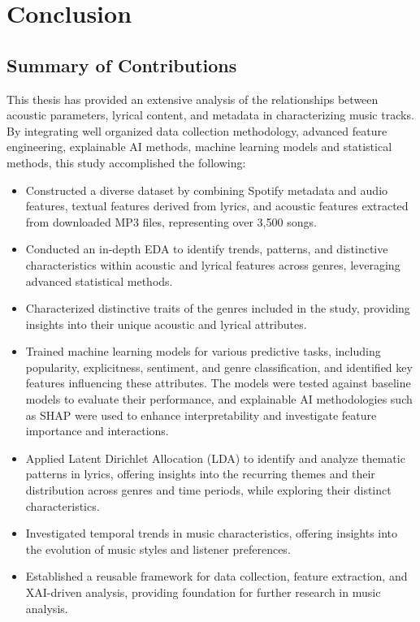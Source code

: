 \chapter{Conclusion}
\label{cha:conclusion}

\section{Summary of Contributions}
\label{sec:summaryofcontributions}

This thesis has provided an extensive analysis of the relationships between
acoustic parameters, lyrical content, and metadata in characterizing music
tracks. By integrating well organized data collection methodology, advanced
feature engineering, explainable AI methods, machine learning models and
statistical methods, this study accomplished the following:

\begin{itemize}
  \item Constructed a diverse dataset by combining Spotify metadata and audio
    features, textual features derived from lyrics, and acoustic features
    extracted from downloaded MP3 files, representing over 3,500 songs.

  \item Conducted an in-depth EDA to identify trends, patterns, and distinctive
    characteristics within acoustic and lyrical features across genres,
    leveraging advanced statistical methods.

  \item Characterized distinctive traits of the genres included in the study,
    providing insights into their unique acoustic and lyrical attributes. 

  \item Trained machine learning models for various predictive tasks, including
    popularity, explicitness, sentiment, and genre classification, and
    identified key features influencing these attributes. The models were
    tested against baseline models to evaluate their performance,
    and explainable AI methodologies such as SHAP were used to enhance
    interpretability and investigate feature importance and interactions.

  \item Applied Latent Dirichlet Allocation (LDA) to identify and analyze
    thematic patterns in lyrics, offering insights into the recurring themes
    and their distribution across genres and time periods, while exploring
    their distinct characteristics.

  \item Investigated temporal trends in music characteristics, offering
    insights into the evolution of music styles and listener preferences.

  \item Established a reusable framework for data collection, feature
    extraction, and XAI-driven analysis, providing foundation for further
    research in music analysis.
\end{itemize}






